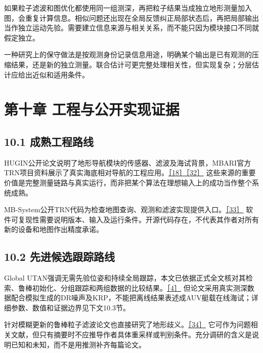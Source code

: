 如果粒子滤波和图优化都使用同一组测深，再把粒子结果当成独立地形测量加入图，会重复计算信息。相似问题还出现在全局反馈纠正局部状态后，再把局部输出当作独立运动先验。需要建立信息来源与相关关系，而不能只因为模块接口不同就假定独立。

一种研究上的保守做法是按观测身份记录信息用途，明确某个输出是已有观测的压缩结果，还是新的独立测量。联合估计可更完整处理相关性，但实现复杂；分层估计应给出近似和适用条件。

\hypertarget{ux7b2cux5341ux7ae0-ux5de5ux7a0bux4e0eux516cux5f00ux5b9eux73b0ux8bc1ux636e}{%
\section{第十章 工程与公开实现证据}\label{ux7b2cux5341ux7ae0-ux5de5ux7a0bux4e0eux516cux5f00ux5b9eux73b0ux8bc1ux636e}}

\hypertarget{ux6210ux719fux5de5ux7a0bux8defux7ebf}{%
\subsection{10.1 成熟工程路线}\label{ux6210ux719fux5de5ux7a0bux8defux7ebf}}

HUGIN公开论文说明了地形导航模块的传感器、滤波及海试背景，MBARI官方TRN项目资料展示了真实海底相对导航的工程应用。\href{https://www.navlab.net/Publications/The_HUGIN_AUV_Terrain_Navigation_Module.pdf}{［18］}\href{https://www.mbari.org/project/terrain-relative-navigation/}{［32］} 这些来源的重要价值是完整测量链路与真实运行，而非把某个算法在理想输入上的成功当作整个系统成熟。

MB-System公开TRN代码为检查地图查询、观测和滤波实现提供入口。\href{https://github.com/dwcaress/MB-System}{［33］} 软件可复现性需要说明版本、输入及运行条件。开源代码存在，不代表其作者对所有新的设备和地图作出精度承诺。

\hypertarget{ux5148ux8fdbux5019ux9009ux8ddfux8e2aux8defux7ebf}{%
\subsection{10.2 先进候选跟踪路线}\label{ux5148ux8fdbux5019ux9009ux8ddfux8e2aux8defux7ebf}}

Global UTAN强调无需先验位姿和持续全局跟踪，本文已依据正式全文核对其检索、鲁棒初始化、分组跟踪和两组数据的比较结果。\href{https://doi.org/10.1109/TIM.2026.3716492}{［4］} 但论文采用真实测深数据配合模拟生成的DR噪声及KRP，不能把离线结果表述成AUV艇载在线海试；详细参数、数值和证据边界见下文10.3节。

针对模糊更新的鲁棒粒子滤波论文也直接研究了地形歧义。\href{https://doi.org/10.1016/j.mechatronics.2023.103133}{［34］} 它可作为问题相关文献，但只有摘要时不应推导作者具体重采样或判别条件。充分调研的含义是说明已知和未知，而不是用推测补齐每篇论文。

